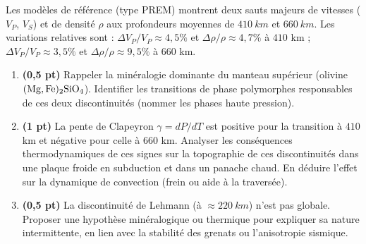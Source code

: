 \documentclass[11pt]{article}
\begin{document}
\begin{exercice}
Les modèles de référence (type PREM) montrent deux sauts majeurs de vitesses ($V_P$, $V_S$) et de densité $\rho$ aux profondeurs moyennes de $\SI{410}{km}$ et $\SI{660}{km}$. Les variations relatives sont : $\Delta V_P / V_P \approx 4,5\%$ et $\Delta \rho / \rho \approx 4,7\%$ à $410$ km ; $\Delta V_P / V_P \approx 3,5\%$ et $\Delta \rho / \rho \approx 9,5\%$ à $660$ km.

\begin{enumerate}
    \item \textbf{(0,5 pt)} Rappeler la minéralogie dominante du manteau supérieur (olivine $\ce{(Mg,Fe)2SiO4}$). Identifier les transitions de phase polymorphes responsables de ces deux discontinuités (nommer les phases haute pression).
    \item \textbf{(1 pt)} La pente de Clapeyron $\gamma = dP/dT$ est positive pour la transition à $410$ km et négative pour celle à $660$ km. Analyser les conséquences thermodynamiques de ces signes sur la topographie de ces discontinuités dans une plaque froide en subduction et dans un panache chaud. En déduire l'effet sur la dynamique de convection (frein ou aide à la traversée).
    \item \textbf{(0,5 pt)} La discontinuité de Lehmann (à $\approx \SI{220}{km}$) n'est pas globale. Proposer une hypothèse minéralogique ou thermique pour expliquer sa nature intermittente, en lien avec la stabilité des grenats ou l'anisotropie sismique.
\end{enumerate}
\end{exercice}
\end{document}
